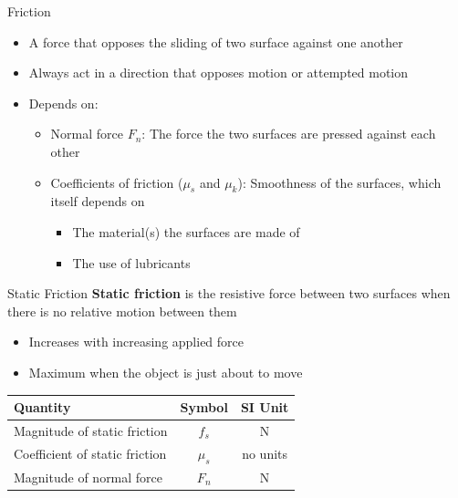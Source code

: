 \documentclass[12pt,compress,aspectratio=169]{beamer}
\begin{document}
\begin{frame}{Friction}
  \begin{itemize}
  \item A force that opposes the sliding of two surface against one another
  \item Always act in a direction that opposes motion or attempted motion
  \item Depends on:
    \begin{itemize}
    \item Normal force $F_n$: The force the two surfaces are pressed against
      each other
    \item Coefficients of friction ($\mu_s$ and $\mu_k$): Smoothness of the
      surfaces, which itself depends on
      \begin{itemize}
      \item The material(s) the surfaces are made of
      \item The use of lubricants
      \end{itemize}
    \end{itemize}
  \end{itemize}
  \begin{center}
    \vspace{-.1in}
  \end{center}
\end{frame}



\begin{frame}{Static Friction}
  \textbf{Static friction} is the resistive force between two surfaces when
  there is no relative motion between them
  \begin{itemize}
  \item Increases with increasing applied force
  \item Maximum when the object is just about to move
  \end{itemize}

  \begin{center}
    \begin{tabular}{l|c|c}
      \rowcolor{pink}
      \textbf{Quantity} & \textbf{Symbol} & \textbf{SI Unit} \\ \hline
      Magnitude of static friction & $f_s$ & \si\newton \\
      Coefficient of static friction & $\mu_s$ & no units \\
      Magnitude of normal force    & $F_n$ & \si\newton
    \end{tabular}
  \end{center}
\end{frame}
\end{document}
